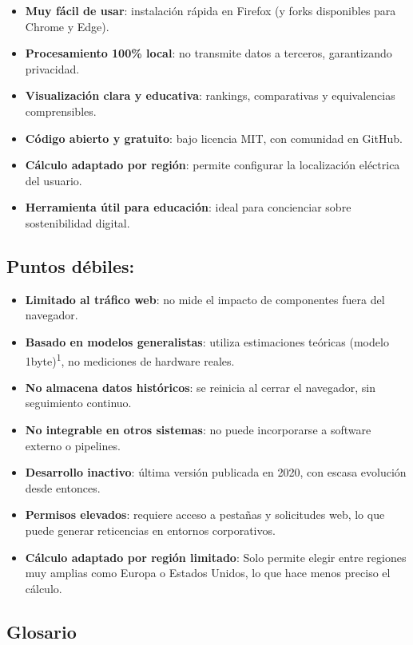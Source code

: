 \documentclass[12pt,a4paper]{report}
\begin{document}
\begin{itemize}
  \item \textbf{Muy fácil de usar}: instalación rápida en Firefox (y forks disponibles para Chrome y Edge).
  \item \textbf{Procesamiento 100\% local}: no transmite datos a terceros, garantizando privacidad.
  \item \textbf{Visualización clara y educativa}: rankings, comparativas y equivalencias comprensibles.
  \item \textbf{Código abierto y gratuito}: bajo licencia MIT, con comunidad en GitHub.
  \item \textbf{Cálculo adaptado por región}: permite configurar la localización eléctrica del usuario.
  \item \textbf{Herramienta útil para educación}: ideal para concienciar sobre sostenibilidad digital.
\end{itemize}

\subsection*{Puntos débiles:}

\begin{itemize}
  \item \textbf{Limitado al tráfico web}: no mide el impacto de componentes fuera del navegador.
  \item \textbf{Basado en modelos generalistas}: utiliza estimaciones teóricas (modelo 1byte)\textsuperscript{1}, no mediciones de hardware reales.
  \item \textbf{No almacena datos históricos}: se reinicia al cerrar el navegador, sin seguimiento continuo.
  \item \textbf{No integrable en otros sistemas}: no puede incorporarse a software externo o pipelines.
  \item \textbf{Desarrollo inactivo}: última versión publicada en 2020, con escasa evolución desde entonces.
  \item \textbf{Permisos elevados}: requiere acceso a pestañas y solicitudes web, lo que puede generar reticencias en entornos corporativos.
  \item \textbf{Cálculo adaptado por región limitado}: Solo permite elegir entre regiones muy amplias como Europa o Estados Unidos, lo que hace menos preciso el cálculo.
\end{itemize}

\subsection*{Glosario}
\end{document}
